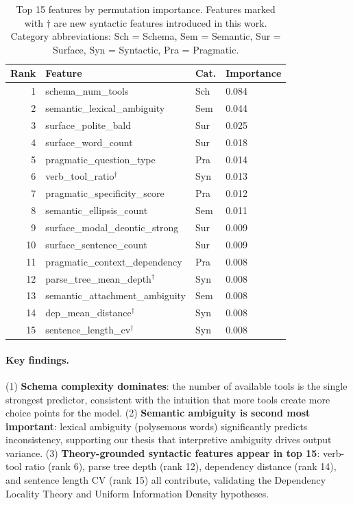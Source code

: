 \documentclass{article}
\begin{document}
\begin{table}[t]
\centering
\caption{Top 15 features by permutation importance. Features marked with $\dagger$ are new syntactic features introduced in this work. Category abbreviations: Sch = Schema, Sem = Semantic, Sur = Surface, Syn = Syntactic, Pra = Pragmatic.}
\label{tab:importance}
\small
\begin{tabular}{@{}rlll@{}}
\toprule
Rank & Feature & Cat. & Importance \\
\midrule
1 & schema\_num\_tools & Sch & 0.084 \\
2 & semantic\_lexical\_ambiguity & Sem & 0.044 \\
3 & surface\_polite\_bald & Sur & 0.025 \\
4 & surface\_word\_count & Sur & 0.018 \\
5 & pragmatic\_question\_type & Pra & 0.014 \\
6 & verb\_tool\_ratio$^\dagger$ & Syn & 0.013 \\
7 & pragmatic\_specificity\_score & Pra & 0.012 \\
8 & semantic\_ellipsis\_count & Sem & 0.011 \\
9 & surface\_modal\_deontic\_strong & Sur & 0.009 \\
10 & surface\_sentence\_count & Sur & 0.009 \\
11 & pragmatic\_context\_dependency & Pra & 0.008 \\
12 & parse\_tree\_mean\_depth$^\dagger$ & Syn & 0.008 \\
13 & semantic\_attachment\_ambiguity & Sem & 0.008 \\
14 & dep\_mean\_distance$^\dagger$ & Syn & 0.008 \\
15 & sentence\_length\_cv$^\dagger$ & Syn & 0.008 \\
\bottomrule
\end{tabular}
\end{table}

\paragraph{Key findings.}
(1) \textbf{Schema complexity dominates}: the number of available tools is the single strongest predictor, consistent with the intuition that more tools create more choice points for the model. (2) \textbf{Semantic ambiguity is second most important}: lexical ambiguity (polysemous words) significantly predicts inconsistency, supporting our thesis that interpretive ambiguity drives output variance. (3) \textbf{Theory-grounded syntactic features appear in top 15}: verb-tool ratio (rank 6), parse tree depth (rank 12), dependency distance (rank 14), and sentence length CV (rank 15) all contribute, validating the Dependency Locality Theory and Uniform Information Density hypotheses.
\end{document}
